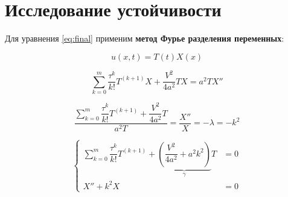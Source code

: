 \section{Исследование устойчивости}

Для уравнения \ref{eq:final} применим \textbf{метод Фурье разделения переменных}:

\begin{equation*}
u(x,t) = T(t) X(x)
\end{equation*}

\begin{equation*}
\sum\limits_{k=0}^{m} \dfrac{\tau^k}{k!} T^{(k+1)} X + \dfrac{V^2}{4a^2} T X =a^2 T X''
\end{equation*}

\begin{equation*}
\dfrac{\sum\limits_{k=0}^{m} \dfrac{\tau^k}{k!} T^{(k+1)} + \dfrac{V^2}{4a^2} T}{a^2 T} = \dfrac{X''}{X} = -\lambda = -k^2
\end{equation*}

\begin{equation}
\left\{
\begin{aligned}
\sum\limits_{k=0}^{m} \dfrac{\tau^k}{k!} T^{(k+1)} + \underbrace{ \left( \dfrac{V^2}{4a^2} + a^2 k^2 \right)}_{\gamma} T & = 0\\
X'' + k^2 X & = 0
\end{aligned}
\right.
\end{equation}